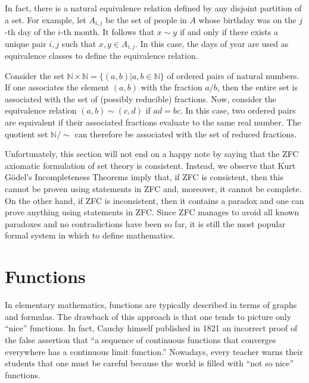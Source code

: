 In fact, there is a natural equivalence relation defined by any disjoint partition of a set.
For example, let $A_{i,j}$ be the set of people in $A$ whose birthday was on the $j$-th day of the $i$-th month.
It follows that $x\sim y$ if and only if there exists a unique pair $i,j$ such that $x,y \in A_{i,j}$.
In this case, the days of year are used as equivalence classes to define the equivalence relation.

\begin{example}
Consider the set $\mathbb{N} \times \mathbb{N} = \{ (a,b) | a,b\in\mathbb{N} \}$ of ordered pairs of natural numbers.
If one associates the element $(a,b)$ with the fraction $a/b$, then the entire set is associated with the set of (possibly reducible) fractions.
Now, consider the equivalence relation $(a,b) \sim (c,d)$ if $ad=bc$.
In this case, two ordered pairs are equivalent if their associated fractions evaluate to the same real number.
The quotient set $\mathbb{N} / \!\! \sim$ can therefore be associated with the set of reduced fractions.
\end{example}

Unfortunately, this section will not end on a happy note by saying that the ZFC axiomatic formulation of set theory is consistent.
Instead, we observe that Kurt G\"{o}del's Incompleteness Theorems imply that, if ZFC is consistent, then this cannot be proven using statements in ZFC and, moreover, it cannot be complete.
On the other hand, if ZFC is inconsistent, then it contains a paradox and one can prove anything using statements in ZFC.
Since ZFC manages to avoid all known paradoxes and no contradictions have been so far, it is still the most popular formal system in which to define mathematics.


\section{Functions}

In elementary mathematics, functions are typically described in terms of graphs and formulas.
The drawback of this approach is that one tends to picture only ``nice'' functions.
In fact, Cauchy himself published in 1821 an incorrect proof of the false assertion that ``a sequence of continuous functions that converges everywhere has a continuous limit function.''
Nowadays, every teacher warns their students that one must be careful because the world is filled with ``not so nice'' functions.

